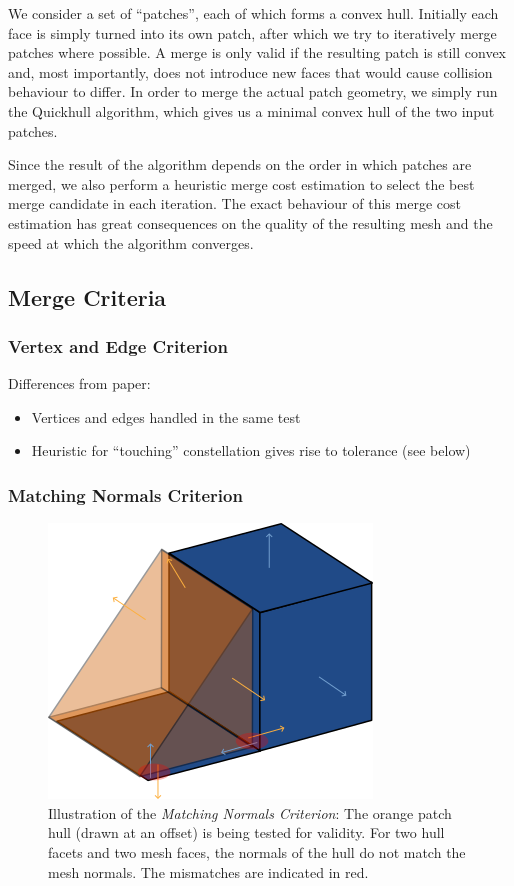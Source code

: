 \documentclass[format=sigconf]{acmart}
\begin{document}
We consider a set of ``patches'', each of which forms a convex hull. Initially each face is simply turned into its own patch, after which we try to iteratively merge patches where possible. A merge is only valid if the resulting patch is still convex and, most importantly, does not introduce new faces that would cause collision behaviour to differ. In order to merge the actual patch geometry, we simply run the Quickhull algorithm, which gives us a minimal convex hull of the two input patches.

Since the result of the algorithm depends on the order in which patches are merged, we also perform a heuristic merge cost estimation to select the best merge candidate in each iteration. The exact behaviour of this merge cost estimation has great consequences on the quality of the resulting mesh and the speed at which the algorithm converges.

\subsection{Merge Criteria}

\subsubsection{Vertex and Edge Criterion}

Differences from paper:
\begin{itemize}
\item Vertices and edges handled in the same test
\item Heuristic for ``touching'' constellation gives rise to tolerance (see below)
\end{itemize}

\subsubsection{Matching Normals Criterion}

\begin{figure}[h]
  \centering
  \includegraphics[width=.5\linewidth]{normal-criterion.png}
  \caption{Illustration of the \emph{Matching Normals Criterion}: The orange patch hull (drawn at an offset) is being tested for validity. For two hull facets and two mesh faces, the normals of the hull do not match the mesh normals. The mismatches are indicated in red.}
  \label{fig:matching-normals}
\end{figure}
\end{document}
